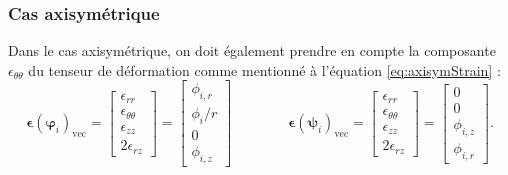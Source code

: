 \documentclass[12pt]{article}
\newcommand{\strain}{\boldsymbol{\epsilon}}
\newcommand{\shapeu}{\boldsymbol{\varphi}}
\newcommand{\shapev}{\boldsymbol{\psi}}
\begin{document}
\subsubsection{Cas axisymétrique}
Dans le cas axisymétrique, on doit également prendre en compte la
composante $\epsilon_{\theta\theta}$ du tenseur de déformation comme mentionné
à l'équation \eqref{eq:axisymStrain} :
\begin{equation}
    \strain(\shapeu_{i})_{\textrm{vec}} = 
    \begin{bmatrix}
        \epsilon_{rr} \\
        \epsilon_{\theta\theta} \\
        \epsilon_{zz} \\
        2\epsilon_{rz}
    \end{bmatrix} =
    \begin{bmatrix}
        \phi_{i,r}\\
        \phi_i / r\\
        0\\
        \phi_{i,z}
    \end{bmatrix} \qquad\qquad
    \strain(\shapev_{i})_{\textrm{vec}} =
    \begin{bmatrix}
        \epsilon_{rr} \\
        \epsilon_{\theta\theta} \\
        \epsilon_{zz} \\
        2\epsilon_{rz}
    \end{bmatrix} =
    \begin{bmatrix}
        0\\
        0\\
        \phi_{i,z}\\
        \phi_{i,r}
    \end{bmatrix}.
\end{equation}
\end{document}
